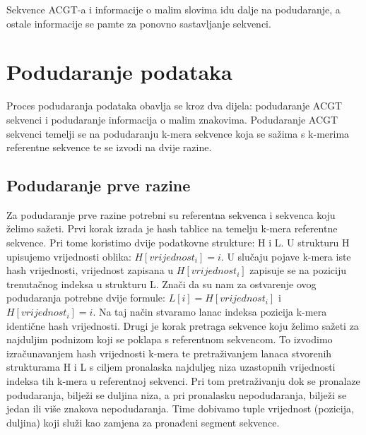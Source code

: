 Sekvence ACGT-a i informacije o malim slovima idu dalje na podudaranje, a ostale informacije se pamte za ponovno sastavljanje sekvenci.



 
\section{Podudaranje podataka}
Proces podudaranja podataka obavlja se kroz dva dijela: podudaranje ACGT sekvenci i podudaranje informacija o malim znakovima. Podudaranje ACGT sekvenci temelji se na podudaranju k-mera sekvence koja se sažima s k-merima referentne sekvence te se izvodi na dvije razine.

\subsection{Podudaranje prve razine}
Za podudaranje prve razine potrebni su referentna sekvenca i sekvenca koju želimo sažeti. 
Prvi korak izrada je hash tablice na temelju k-mera referentne sekvence. Pri tome koristimo dvije podatkovne strukture: H i L. U strukturu H upisujemo vrijednosti oblika: $H[vrijednost_{i}] = i$. U slučaju pojave k-mera iste hash vrijednosti, vrijednost zapisana u $H[vrijednost_{i}]$ zapisuje se na poziciju trenutačnog indeksa u strukturu L. Znači da su nam za ostvarenje ovog podudaranja potrebne dvije formule: $L[i] = H[vrijednost_{i}]$ i $H[vrijednost_{i}] = i$. Na taj način stvaramo lanac indeksa pozicija k-mera identične hash vrijednosti.
Drugi je korak pretraga sekvence koju želimo sažeti za najduljim podnizom koji se poklapa s referentnom sekvencom. To izvodimo izračunavanjem hash vrijednosti k-mera te pretraživanjem lanaca stvorenih strukturama H i L s ciljem pronalaska najduljeg niza uzastopnih vrijednosti indeksa tih k-mera u referentnoj sekvenci. Pri tom pretraživanju dok se pronalaze podudaranja, bilježi se duljina niza, a pri pronalasku nepodudaranja, bilježi se jedan ili više znakova nepodudaranja. Time dobivamo tuple vrijednost (pozicija, duljina) koji služi kao zamjena za pronađeni segment sekvence. 

